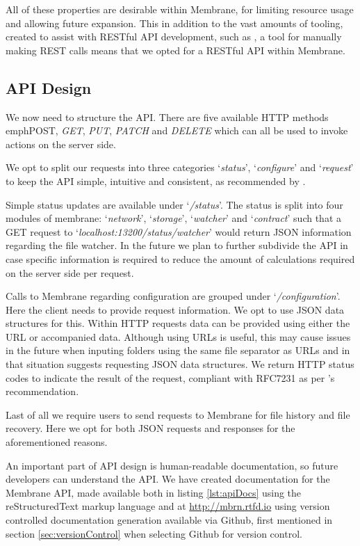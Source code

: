 \documentclass[11pt, a4paper, twocolumn, twoside]{report}
\begin{document}
All of these properties are desirable within Membrane, for limiting resource usage and allowing future expansion. This in addition to the vast amounts of tooling, created to assist with RESTful API development, such as \cite{postman2017api}, a tool for manually making REST calls means that we opted for a RESTful API within Membrane.

\subsection{API Design}

We now need to structure the API. There are five available HTTP methods emph{POST}, \emph{GET}, \emph{PUT}, \emph{PATCH} and \emph{DELETE} which can all be used to invoke actions on the server side.

We opt to split our requests into three categories `\emph{status}', `\emph{configure}' and `\emph{request}' to keep the API simple, intuitive and consistent, as recommended by \cite{google2017api}.

Simple status updates are available under `\emph{/status}'. The status is split into four modules of membrane: `\emph{network}', `\emph{storage}', `\emph{watcher}' and `\emph{contract}' such that a GET request to `\emph{localhost:13200/status/watcher}' would return JSON information regarding the file watcher. In the future we plan to further subdivide the API in case specific information is required to reduce the amount of calculations required on the server side per request.

Calls to Membrane regarding configuration are grouped under `\emph{/configuration}'. Here the client needs to provide request information. We opt to use JSON data structures for this. Within HTTP requests data can be provided using either the URL or accompanied data. Although using URLs is useful, this may cause issues in the future when inputing folders using the same file separator as URLs and in that situation \cite{heroku2017api} suggests requesting JSON data structures. We return HTTP status codes to indicate the result of the request, compliant with RFC7231 \citep{fielding2014hypertext} as per \cite{google2017api}'s recommendation.

Last of all we require users to send requests to Membrane for file history and file recovery. Here we opt for both JSON requests and responses for the aforementioned reasons.

An important part of API design is human-readable documentation, so future developers can understand the API. \citep{heroku2017api} We have created documentation for the Membrane API, made available both in listing \ref{lst:apiDocs} using the reStructuredText markup language and at \url{http://mbrn.rtfd.io} using version controlled documentation generation available via Github, first mentioned in section \ref{sec:versionControl} when selecting Github for version control.
\end{document}
